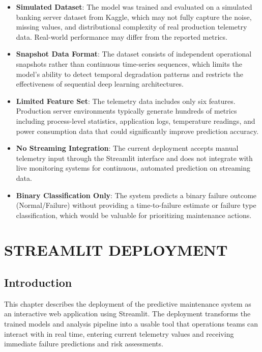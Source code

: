 \documentclass[12pt,letterpaper]{report}
\begin{document}
\begin{itemize}
  \item \textbf{Simulated Dataset}: The model was trained and evaluated on a simulated banking server dataset from Kaggle, which may not fully capture the noise, missing values, and distributional complexity of real production telemetry data. Real-world performance may differ from the reported metrics.
  \item \textbf{Snapshot Data Format}: The dataset consists of independent operational snapshots rather than continuous time-series sequences, which limits the model's ability to detect temporal degradation patterns and restricts the effectiveness of sequential deep learning architectures.
  \item \textbf{Limited Feature Set}: The telemetry data includes only six features. Production server environments typically generate hundreds of metrics including process-level statistics, application logs, temperature readings, and power consumption data that could significantly improve prediction accuracy.
  \item \textbf{No Streaming Integration}: The current deployment accepts manual telemetry input through the Streamlit interface and does not integrate with live monitoring systems for continuous, automated prediction on streaming data.
  \item \textbf{Binary Classification Only}: The system predicts a binary failure outcome (Normal/Failure) without providing a time-to-failure estimate or failure type classification, which would be valuable for prioritizing maintenance actions.
\end{itemize}


\chapter{STREAMLIT DEPLOYMENT}

\section{Introduction}

This chapter describes the deployment of the predictive maintenance system as an interactive web application using Streamlit. The deployment transforms the trained models and analysis pipeline into a usable tool that operations teams can interact with in real time, entering current telemetry values and receiving immediate failure predictions and risk assessments.
\end{document}
